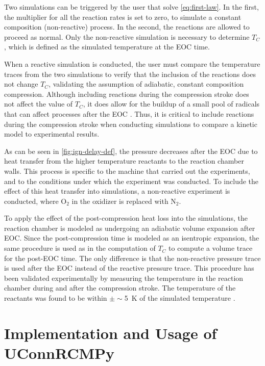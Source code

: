 \documentclass[12pt]{../ussci}
\begin{document}
Two simulations can be triggered by the user that solve \cref{eq:first-law}. In
the first, the multiplier for all the reaction rates is set to zero, to simulate
a constant composition (non-reactive) process. In the second, the reactions are
allowed to proceed as normal. Only the non-reactive simulation is necessary to
determine \(T_C\), which is defined as the simulated temperature at the EOC
time.

When a reactive simulation is conducted, the user must compare the
temperature traces from the two simulations to verify that the inclusion
of the reactions does not change \(T_C\), validating the assumption of
adiabatic, constant composition compression. Although including
reactions during the compression stroke does not affect the value of
\(T_C\), it does allow for the buildup of a small pool of radicals that
can affect processes after the EOC \autocite{Mittal2008}. Thus, it is
critical to include reactions during the compression stroke when
conducting simulations to compare a kinetic model to experimental
results.

As can be seen in \cref{fig:ign-delay-def}, the pressure
decreases after the EOC due to heat transfer from the higher temperature
reactants to the reaction chamber walls. This process is specific to the
machine that carried out the experiments, and to the conditions under
which the experiment was conducted. To include the effect of this heat
transfer into simulations, a non-reactive experiment is conducted, where
\(\text{O}_2\) in the oxidizer is replaced with \(\text{N}_2\).

To apply the effect of the post-compression heat loss into the simulations, the
reaction chamber is modeled as undergoing an adiabatic volume expansion after
EOC. Since the post-compression time is modeled as an isentropic expansion, the
same procedure is used as in the computation of \(T_C\) to compute a volume
trace for the post-EOC time. The only difference is that the non-reactive
pressure trace is used after the EOC instead of the reactive pressure trace.
This procedure has been validated experimentally by measuring the temperature in
the reaction chamber during and after the compression stroke. The temperature of
the reactants was found to be within $\pm\sim $\SI{5}{\K} of the simulated
temperature \autocite{Das2012a,Uddi2012}.

\section{Implementation and Usage of UConnRCMPy}\label{implementation-and-usage-of-uconnrcmpy}
\end{document}
